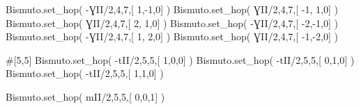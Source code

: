 \documentclass[
  letterpaper,
  DIV=11,
  numbers=noendperiod]{scrreprt}
\newenvironment{Shaded}{\begin{snugshade}}{\end{snugshade}}
\newcommand{\CommentTok}[1]{\textcolor[rgb]{0.37,0.37,0.37}{#1}}
\newcommand{\DecValTok}[1]{\textcolor[rgb]{0.68,0.00,0.00}{#1}}
\newcommand{\NormalTok}[1]{\textcolor[rgb]{0.00,0.23,0.31}{#1}}
\newcommand{\OperatorTok}[1]{\textcolor[rgb]{0.37,0.37,0.37}{#1}}
\begin{document}
\begin{Shaded}
\begin{Highlighting}[]
\NormalTok{Bismuto.set\_hop( }\OperatorTok{{-}}\NormalTok{ƔII}\OperatorTok{/}\DecValTok{2}\NormalTok{,}\DecValTok{4}\NormalTok{,}\DecValTok{7}\NormalTok{,[  }\DecValTok{1}\NormalTok{,}\OperatorTok{{-}}\DecValTok{1}\NormalTok{,}\DecValTok{0}\NormalTok{] ) }
\NormalTok{Bismuto.set\_hop(  ƔII}\OperatorTok{/}\DecValTok{2}\NormalTok{,}\DecValTok{4}\NormalTok{,}\DecValTok{7}\NormalTok{,[ }\OperatorTok{{-}}\DecValTok{1}\NormalTok{, }\DecValTok{1}\NormalTok{,}\DecValTok{0}\NormalTok{] )}
\NormalTok{Bismuto.set\_hop(  ƔII}\OperatorTok{/}\DecValTok{2}\NormalTok{,}\DecValTok{4}\NormalTok{,}\DecValTok{7}\NormalTok{,[  }\DecValTok{2}\NormalTok{, }\DecValTok{1}\NormalTok{,}\DecValTok{0}\NormalTok{] ) }
\NormalTok{Bismuto.set\_hop( }\OperatorTok{{-}}\NormalTok{ƔII}\OperatorTok{/}\DecValTok{2}\NormalTok{,}\DecValTok{4}\NormalTok{,}\DecValTok{7}\NormalTok{,[ }\OperatorTok{{-}}\DecValTok{2}\NormalTok{,}\OperatorTok{{-}}\DecValTok{1}\NormalTok{,}\DecValTok{0}\NormalTok{] )}
\NormalTok{Bismuto.set\_hop( }\OperatorTok{{-}}\NormalTok{ƔII}\OperatorTok{/}\DecValTok{2}\NormalTok{,}\DecValTok{4}\NormalTok{,}\DecValTok{7}\NormalTok{,[  }\DecValTok{1}\NormalTok{, }\DecValTok{2}\NormalTok{,}\DecValTok{0}\NormalTok{] ) }
\NormalTok{Bismuto.set\_hop(  ƔII}\OperatorTok{/}\DecValTok{2}\NormalTok{,}\DecValTok{4}\NormalTok{,}\DecValTok{7}\NormalTok{,[ }\OperatorTok{{-}}\DecValTok{1}\NormalTok{,}\OperatorTok{{-}}\DecValTok{2}\NormalTok{,}\DecValTok{0}\NormalTok{] )}
\end{Highlighting}
\end{Shaded}

\begin{Shaded}
\begin{Highlighting}[]
\CommentTok{\#[5,5]}
\NormalTok{Bismuto.set\_hop( }\OperatorTok{{-}}\NormalTok{tII}\OperatorTok{/}\DecValTok{2}\NormalTok{,}\DecValTok{5}\NormalTok{,}\DecValTok{5}\NormalTok{,[ }\DecValTok{1}\NormalTok{,}\DecValTok{0}\NormalTok{,}\DecValTok{0}\NormalTok{] ) }
\NormalTok{Bismuto.set\_hop( }\OperatorTok{{-}}\NormalTok{tII}\OperatorTok{/}\DecValTok{2}\NormalTok{,}\DecValTok{5}\NormalTok{,}\DecValTok{5}\NormalTok{,[ }\DecValTok{0}\NormalTok{,}\DecValTok{1}\NormalTok{,}\DecValTok{0}\NormalTok{] ) }
\NormalTok{Bismuto.set\_hop( }\OperatorTok{{-}}\NormalTok{tII}\OperatorTok{/}\DecValTok{2}\NormalTok{,}\DecValTok{5}\NormalTok{,}\DecValTok{5}\NormalTok{,[ }\DecValTok{1}\NormalTok{,}\DecValTok{1}\NormalTok{,}\DecValTok{0}\NormalTok{] ) }
 
\NormalTok{Bismuto.set\_hop(  mII}\OperatorTok{/}\DecValTok{2}\NormalTok{,}\DecValTok{5}\NormalTok{,}\DecValTok{5}\NormalTok{,[ }\DecValTok{0}\NormalTok{,}\DecValTok{0}\NormalTok{,}\DecValTok{1}\NormalTok{] ) }
\end{Highlighting}
\end{Shaded}
\end{document}
